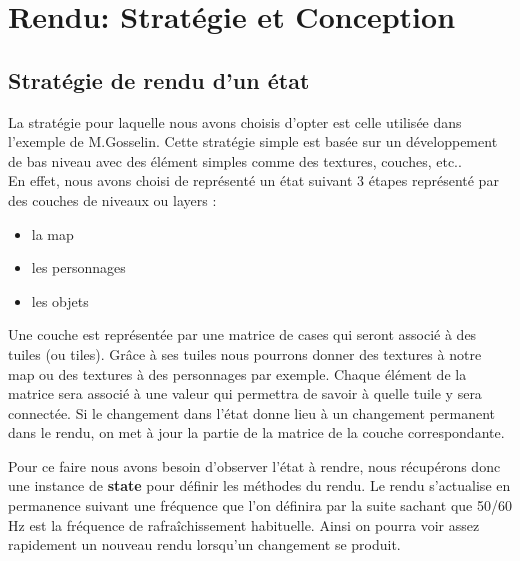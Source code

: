 \documentclass[a4paper,12pt]{article}
\begin{document}
\clearpage
\section{Rendu: Stratégie et Conception}

\subsection{Stratégie de rendu d'un état}
La stratégie pour laquelle nous avons choisis d'opter est celle utilisée dans l'exemple de M.Gosselin. Cette stratégie simple est basée sur un développement de bas niveau avec des élément simples comme des textures, couches, etc..\\
En effet, nous avons choisi de représenté un état suivant 3 étapes représenté par des couches de niveaux ou layers :\\
\begin{itemize}
\item la map 
\item les personnages
\item les objets\\
\end{itemize}
\par 
Une couche est représentée par une matrice de cases qui seront associé à des tuiles (ou tiles). Grâce à ses tuiles nous pourrons donner des textures à notre map ou des textures à des personnages par exemple. Chaque élément de la matrice sera associé à une valeur qui permettra de savoir à quelle tuile y sera connectée. Si le changement dans l’état donne lieu à un changement permanent dans le rendu, on met à jour la partie de la matrice de la couche correspondante.\\
\par
Pour ce faire nous avons besoin d’observer l’état à rendre, nous récupérons donc une instance de \textbf{state} pour définir les méthodes du rendu. Le rendu s'actualise en permanence suivant une fréquence que l'on définira par la suite sachant que 50/60 Hz est la fréquence de rafraîchissement habituelle. Ainsi on pourra voir assez rapidement un nouveau rendu lorsqu’un changement se produit.\\
\end{document}
